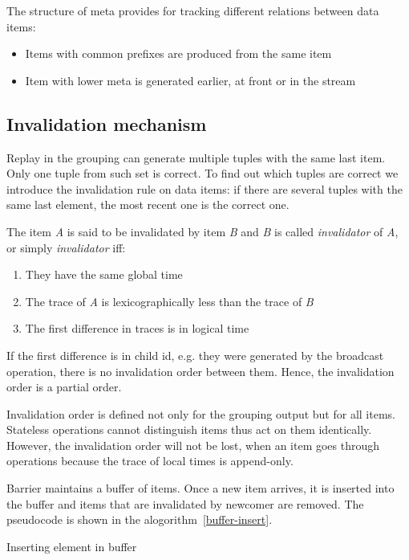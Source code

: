 The structure of meta provides for tracking different relations between data items:

\begin{itemize}
  \item Items with common prefixes are produced from the same item
  \item Item with lower meta is generated earlier, at front or in the stream
\end{itemize}

\subsection{Invalidation mechanism}

Replay in the grouping can generate multiple tuples with the same last item. Only one tuple from such set is correct. To find out which tuples are correct we introduce the invalidation rule on data items: if there are several tuples with the same last element, the most recent one is the correct one.

The item {\it A} is said to be invalidated by item {\it B} and {\it B} is called {\it invalidator} of {\it A}, or simply {\it invalidator} iff:

\begin{enumerate}
\item They have the same global time
\item The trace of {\it A} is lexicographically less than the trace of {\it B}
\item The first difference in traces is in logical time
\end{enumerate}

If the first difference is in child id, e.g. they were generated by the broadcast operation, there is no invalidation order between them. Hence, the invalidation order is a partial order. 

Invalidation order is defined not only for the grouping output but for all items. Stateless operations cannot distinguish items thus act on them identically. However, the invalidation order will not be lost, when an item goes through operations because the trace of local times is append-only.

Barrier maintains a buffer of items. Once a new item arrives, it is inserted into the buffer and items that are invalidated by newcomer are removed. The pseudocode is shown in the alogorithm~\ref{buffer-insert}.

\begin{algorithm}
\caption{Inserting element in buffer}
\label{buffer-insert}
\begin{algorithmic}
        \State {}
      \EndIf
    \EndFor
    \State {}
  \EndFunction
\end{algorithmic}
\end{algorithm}

